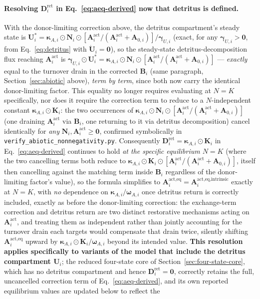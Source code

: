 \documentclass[twocolumn,10pt]{article}
\begin{document}
\paragraph{Resolving $\mathbf D^{\text{ret}}_i$ in Eq.~\eqref{eq:aeq-derived} now that detritus is defined.} With the donor-limiting correction above, the detritus compartment's steady state is $\mathbf U_i^*=\boldsymbol\kappa_{A,i}\odot\mathbf N_i\odot[\mathbf A^{\text{act}}_i/(\mathbf A^{\text{act}}_i+\mathbf A_{0,i})]/\boldsymbol\gamma_{U,i}$ (exact, for any $\boldsymbol\gamma_{U,i}>\mathbf 0$, from Eq.~\eqref{eq:detritus} with $\dot{\mathbf U}_i=\mathbf 0$), so the steady-state detritus-decomposition flux reaching $\mathbf A^{\text{act}}_i$ is $\boldsymbol\gamma_{U,i}\odot\mathbf U_i^*=\boldsymbol\kappa_{A,i}\odot\mathbf N_i\odot[\mathbf A^{\text{act}}_i/(\mathbf A^{\text{act}}_i+\mathbf A_{0,i})]$ --- \emph{exactly} equal to the turnover drain in the corrected $\mathbf B_i$ (same paragraph, Section~\ref{sec:abiotic} above), \emph{term by term}, since both now carry the identical donor-limiting factor. This equality no longer requires evaluating at $N=K$ specifically, nor does it require the correction term to reduce to a $N$-independent constant $\boldsymbol\kappa_{A,i}\odot\mathbf K_i$: the two occurrences of $\boldsymbol\kappa_{A,i}\odot\mathbf N_i\odot[\mathbf A^{\text{act}}_i/(\mathbf A^{\text{act}}_i+\mathbf A_{0,i})]$ (one draining $\mathbf A^{\text{act}}_i$ via $\mathbf B_i$, one returning to it via detritus decomposition) cancel identically for \emph{any} $\mathbf N_i,\mathbf A^{\text{act}}_i\ge\mathbf 0$, confirmed symbolically in \texttt{verify\_abiotic\_nonnegativity.py}. Consequently $\mathbf D^{\text{ret}}_i=\boldsymbol\kappa_{A,i}\odot\mathbf K_i$ in Eq.~\eqref{eq:aeq-derived} continues to hold \emph{at the specific equilibrium $N=K$} (where the two cancelling terms both reduce to $\boldsymbol\kappa_{A,i}\odot\mathbf K_i\odot[\mathbf A^{\text{act}}_i/(\mathbf A^{\text{act}}_i+\mathbf A_{0,i})]$, itself then cancelling against the matching term inside $\mathbf B_i$ regardless of the donor-limiting factor's value), so the formula simplifies to $\mathbf A^{\text{act},\text{eq}}_i=\mathbf A^{\text{act},\text{eq,intrinsic}}_i$ exactly at $N=K$, with \emph{no} dependence on $\boldsymbol\kappa_{A,i}/\boldsymbol\omega_{A,i}$ once detritus return is correctly included, exactly as before the donor-limiting correction: the exchange-term correction and detritus return are two distinct restorative mechanisms acting on $\mathbf A^{\text{act}}_i$, and treating them as independent rather than jointly accounting for the turnover drain each targets would compensate that drain twice, silently shifting $\mathbf A^{\text{act},\text{eq}}_i$ upward by $\boldsymbol\kappa_{A,i}\odot\mathbf K_i/\boldsymbol\omega_{A,i}$ beyond its intended value. \textbf{This resolution applies specifically to variants of the model that include the detritus compartment $\mathbf U_i$}; the reduced four-state core of Section~\ref{sec:four-state-core}, which has no detritus compartment and hence $\mathbf D^{\text{ret}}_i=\mathbf 0$, correctly retains the full, uncancelled correction term of Eq.~\eqref{eq:aeq-derived}, and its own reported equilibrium values are updated below to reflect the 
\end{document}
